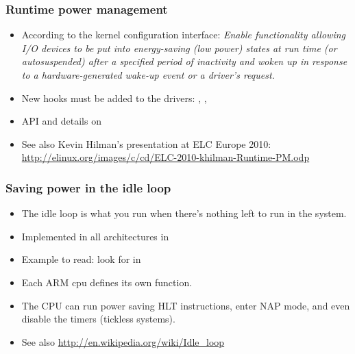 \begin{frame}
  \frametitle{Runtime power management}
  \begin{itemize}
  \item According to the kernel configuration interface: \emph{Enable
      functionality allowing I/O devices to be put into energy-saving
      (low power) states at run time (or autosuspended) after a
      specified period of inactivity and woken up in response to a
      hardware-generated wake-up event or a driver's request.}
  \item New hooks must be added to the drivers:
    , ,
  \item API and details on 
  \item See also Kevin Hilman's presentation at ELC Europe 2010:
    \url{http://elinux.org/images/c/cd/ELC-2010-khilman-Runtime-PM.odp}
  \end{itemize}
\end{frame}

\begin{frame}
  \frametitle{Saving power in the idle loop}
  \begin{itemize}
  \item The idle loop is what you run when there's nothing left to run
    in the system.
  \item Implemented in all architectures in
  \item Example to read: look for  in
  \item Each ARM cpu defines its own  function.
  \item The CPU can run power saving HLT instructions, enter NAP mode,
    and even disable the timers (tickless systems).
  \item See also \url{http://en.wikipedia.org/wiki/Idle_loop}
  \end{itemize}
\end{frame}


